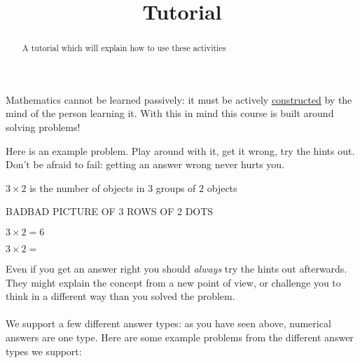 \documentclass{ximera}
\title{Tutorial}
\begin{document}
\begin{abstract}
	A tutorial which will explain how to use these activities
\end{abstract}

Mathematics cannot be learned passively:  it must be actively \href{http://en.wikipedia.org/wiki/Constructivism_(philosophy_of_education)}{constructed} by 
the mind of the person learning it.  With this in mind  this course is built around solving problems!

Here is an example problem.  Play around with it, get it wrong, try the hints out.  Don't be afraid to fail:  getting an answer wrong never hurts you.

\begin{problem}
	\begin{solution}
		\begin{hint}
			$3 \times 2$ is the number of objects in $3$ groups of $2$ objects
		\end{hint}
		\begin{hint}
			BADBAD PICTURE OF 3 ROWS OF 2 DOTS
		\end{hint}
		\begin{hint}
			$3\times 2=6$
		\end{hint}
		$3\times 2 = $ 
	\end{solution}
\end{problem}

Even if you get an answer right you should \textit{always} try the hints out afterwards.  They might explain the concept from a new point of view, or challenge you to
think in a different way than you solved the problem.
\\
\\
We support a few different answer types:  as you have seen above, numerical answers are one type.  Here are some example problems from the different answer types we 
support:
\\
\\
\end{document}
